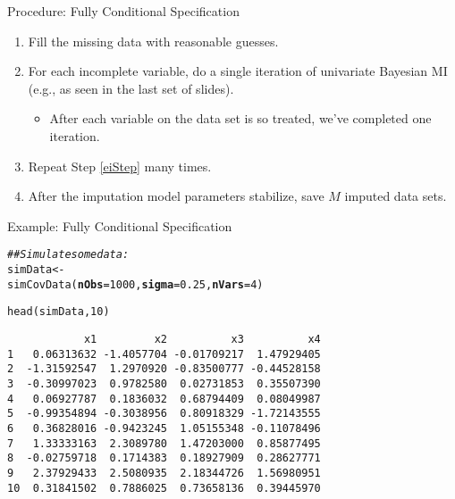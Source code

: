 \documentclass[10pt]{beamer}\usepackage[]{graphicx}\usepackage[]{color}
\makeatletter
\newcommand{\hlnum}[1]{\textcolor[rgb]{0.69,0.494,0}{#1}}%
\newcommand{\hlcom}[1]{\textcolor[rgb]{0.514,0.506,0.514}{\textit{#1}}}%
\newcommand{\hlstd}[1]{\textcolor[rgb]{0,0,0}{#1}}%
\newcommand{\hlkwb}[1]{\textcolor[rgb]{0,0.341,0.682}{#1}}%
\newcommand{\hlkwc}[1]{\textcolor[rgb]{0,0,0}{\textbf{#1}}}%
\newcommand{\hlkwd}[1]{\textcolor[rgb]{0.004,0.004,0.506}{#1}}%
\newenvironment{kframe}{%
 \def\at@end@of@kframe{}%
 \ifinner\ifhmode%
  \def\at@end@of@kframe{\end{minipage}}%
  \begin{minipage}{\columnwidth}%
 \fi\fi%
 \def\FrameCommand##1{\hskip\@totalleftmargin \hskip-\fboxsep
 \colorbox{shadecolor}{##1}\hskip-\fboxsep
     \hskip-\linewidth \hskip-\@totalleftmargin \hskip\columnwidth}%
 \MakeFramed {\advance\hsize-\width
   \@totalleftmargin\z@ \linewidth\hsize
   \@setminipage}}%
 {\par\unskip\endMakeFramed%
 \at@end@of@kframe}
\newenvironment{knitrout}{}{} %
\makeatother
\begin{document}


\begin{frame}{Procedure: Fully Conditional Specification}
  
  \begin{enumerate}
  \item Fill the missing data with reasonable guesses.
    \vb
  \item For each incomplete variable, do a single iteration of univariate 
    Bayesian MI (e.g., as seen in the last set of slides). \label{eiStep}
    \vb
    \begin{itemize}
    \item After each variable on the data set is so treated, we've completed one 
      iteration.
    \end{itemize}
    \vc
  \item Repeat Step \ref{eiStep} many times.
    \vb
  \item After the imputation model parameters stabilize, save $M$ imputed data 
    sets.
  \end{enumerate}
  
\end{frame}

\watermarkoff %

\begin{frame}[fragile]{Example: Fully Conditional Specification}
  
\begin{knitrout}\footnotesize
{}\color{fgcolor}\begin{kframe}
\begin{alltt}
\hlcom{## Simulate some data:}
\hlstd{simData} \hlkwb{<-}
    \hlkwd{simCovData}\hlstd{(}\hlkwc{nObs} \hlstd{=} \hlnum{1000}\hlstd{,} \hlkwc{sigma} \hlstd{=} \hlnum{0.25}\hlstd{,} \hlkwc{nVars} \hlstd{=} \hlnum{4}\hlstd{)}

\hlkwd{head}\hlstd{(simData,} \hlnum{10}\hlstd{)}
\end{alltt}
\begin{verbatim}
            x1         x2          x3          x4
1   0.06313632 -1.4057704 -0.01709217  1.47929405
2  -1.31592547  1.2970920 -0.83500777 -0.44528158
3  -0.30997023  0.9782580  0.02731853  0.35507390
4   0.06927787  0.1836032  0.68794409  0.08049987
5  -0.99354894 -0.3038956  0.80918329 -1.72143555
6   0.36828016 -0.9423245  1.05155348 -0.11078496
7   1.33333163  2.3089780  1.47203000  0.85877495
8  -0.02759718  0.1714383  0.18927909  0.28627771
9   2.37929433  2.5080935  2.18344726  1.56980951
10  0.31841502  0.7886025  0.73658136  0.39445970
\end{verbatim}
\end{kframe}
\end{knitrout}

\end{frame}
\end{document}
